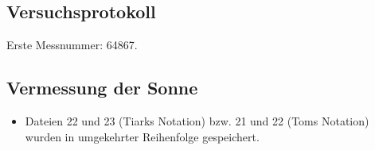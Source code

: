 \documentclass[../../main.tex]{subfiles}
\begin{document}
    \subsection*{Versuchsprotokoll} 
    Erste Messnummer: 64867.

    \subsection*{Vermessung der Sonne}
    \begin{itemize}
        \item Dateien 22 und 23 (Tiarks Notation) bzw. 21 und 22 (Toms Notation) wurden in umgekehrter Reihenfolge gespeichert.
    \end{itemize}
\end{document}
